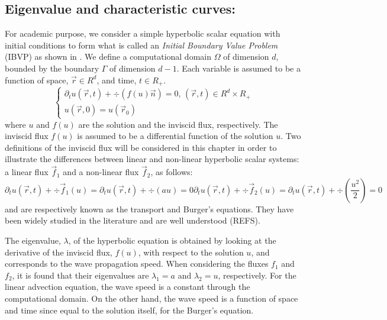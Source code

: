\subsection{Eigenvalue and characteristic curves:}\label{sec:mat_ppr}
For academic purpose, we consider a simple hyperbolic scalar equation with initial conditions to form what is called an \emph{Initial Boundary Value Problem} (IBVP) as shown in . We define a computational domain $\Omega$ of dimension $d$, bounded by the boundary $\Gamma$ of dimension $d-1$. Each variable is assumed to be a function of space, $\vec{r} \in R^d$, and time, $t \in R_+$.
%
\begin{equation}\label{eq:ivp_sct1b}
\left\{
\begin{array}{l}
\partial_t u(\vec{r},t) + \div ( f(u) \vec{n} ) = 0 \text{, } \left( \vec{r}, t \right) \in R^d \times R_+  \\
u(\vec{r},0) = u( \vec{r}_0) 
\end{array}
\right.
\end{equation}
%
where $u$ and $f(u)$ are the solution and the inviscid flux, respectively. The inviscid flux $f(u)$ is assumed to be a differential function of the solution $u$. Two definitions of the inviscid flux will be considered in this chapter in order to illustrate the differences between linear and non-linear hyperbolic scalar systems: a linear flux $\vec{f}_1$ and a non-linear flux $\vec{f}_2$, as follows:
%
\begin{subequations}\label{eq:ivp2_sct1b}
%
\begin{equation}\label{eq:trans_sct1b}
\partial_t u(\vec{r},t) + \div \vec{f}_1(u) = \partial_t u(\vec{r},t) + \div \left( au \right) = 0
\end{equation}
%
\begin{equation}\label{eq:burger_sct1b}
\partial_t u(\vec{r},t) + \div \vec{f}_2(u) = \partial_t u(\vec{r},t) + \div \left( \frac{u^2}{2} \right) = 0
\end{equation}
%
\end{subequations}
%
 and  are respectively known as the transport and Burger's equations. They have been widely studied in the literature and are well understood (REFS). 

The eigenvalue, $\lambda$, of the hyperbolic equation is obtained by looking at the derivative of the inviscid flux, $f(u)$, with respect to the solution $u$, and corresponds to the wave propagation speed. When considering the fluxes $f_1$ and $f_2$, it is found that their eigenvalues are $\lambda_1 = a$ and $\lambda_2 = u$, respectively. For the linear advection equation, the wave speed is a constant through the computational domain. On the other hand, the wave speed is a function of space and time since equal to the solution itself, for the Burger's equation.


